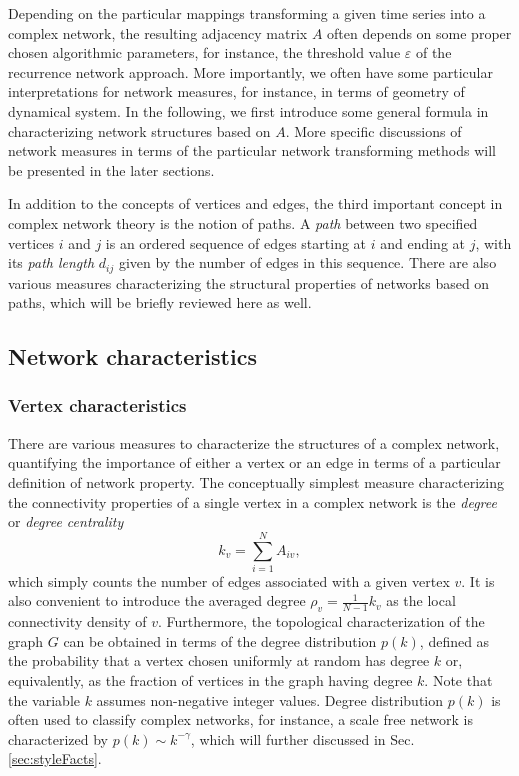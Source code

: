	Depending on the particular mappings transforming a given time series into a complex network, the resulting adjacency matrix $A$ often depends on some proper chosen algorithmic parameters, for instance, the threshold value $\varepsilon$ of the recurrence network approach. More importantly, we often have some particular interpretations for network measures, for instance, in terms of geometry of dynamical system. In the following, we first introduce some general formula in characterizing network structures based on $A$. More specific discussions of network measures in terms of the particular network transforming methods will be presented in the later sections. 

	In addition to the concepts of vertices and edges, the third important concept in complex network theory is the notion of paths. A \emph{path} between two specified vertices $i$ and $j$ is an ordered sequence of edges starting at $i$ and ending at $j$, with its \emph{path length} $d_{ij}$ given by the number of edges in this sequence. There are also various measures characterizing the structural properties of networks based on paths, which will be briefly reviewed here as well.  

	\subsection{Network characteristics} \label{sec:basictheoryCN}
		\subsubsection{Vertex characteristics}
		There are various measures to characterize the structures of a complex network, quantifying the importance of either a vertex or an edge in terms of a particular definition of network property. The conceptually simplest measure characterizing the connectivity properties of a single vertex in a complex network is the \textit{degree} or \textit{degree centrality}
\begin{equation} 
k_v=\sum_{i=1}^N A_{iv} ,
\label{eq:degree}
\end{equation}
\noindent
which simply counts the number of edges associated with a given vertex $v$. It is also convenient to introduce the averaged degree $\rho_v = \frac{1}{N-1} k_v$ as the local connectivity density of $v$. Furthermore, the topological characterization of the graph $G$ can be obtained in terms of the degree distribution $p(k)$, defined as the probability that a vertex chosen uniformly at random has degree $k$ or, equivalently, as the fraction of vertices in the graph having degree $k$. Note that the variable $k$ assumes non-negative integer values. Degree distribution $p(k)$ is often used to classify complex networks, for instance, a scale free network is characterized by $p(k) \sim k^{-\gamma}$, which will further discussed in Sec. \ref{sec:styleFacts}. 


